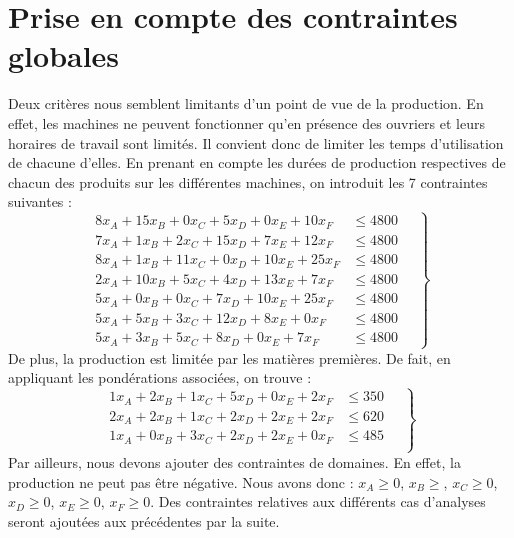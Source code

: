 \documentclass[12pt]{article}
\begin{document}
\section{Prise en compte des contraintes globales}
\label{globconst}
Deux critères nous semblent limitants d'un point de vue de la production. En effet, les machines ne peuvent fonctionner qu'en présence des ouvriers et leurs horaires de travail sont limités. Il convient donc de limiter les temps d'utilisation de chacune d'elles.
En prenant en compte les durées de production respectives de chacun des produits sur les différentes machines, on introduit les 7 contraintes suivantes :
\begin{equation*}
\left.
\begin{aligned}
    8x_{A} + 15x_{B} + 0x_{C} + 5x_{D} + 0x_{E} + 10x_{F} &\leq 4800
    \quad\\
      7x_{A} + 1x_{B} + 2x_{C} + 15x_{D} + 7x_{E} + 12x_{F} &\leq 4800 \\
      8x_{A} + 1x_{B} + 11x_{C} + 0x_{D} + 10x_{E} + 25x_{F} &\leq 4800 \\
      2x_{A} + 10x_{B} + 5x_{C} + 4x_{D} + 13x_{E} + 7x_{F} &\leq 4800 \\
      5x_{A} + 0x_{B} + 0x_{C} + 7x_{D} + 10x_{E} + 25x_{F} &\leq 4800 \\
      5x_{A} + 5x_{B} + 3x_{C} + 12x_{D} + 8x_{E} + 0x_{F} &\leq 4800 \\
      5x_{A} + 3x_{B} + 5x_{C} + 8x_{D} + 0x_{E} + 7x_{F} &\leq 4800 
\end{aligned}
\right\}
\end{equation*}
De plus, la production est limitée par les matières premières. De fait, en appliquant les pondérations associées, on trouve :
\begin{equation*}
\left.
\begin{aligned}
         1x_{A} + 2x_{B} + 1x_{C} + 5x_{D} + 0x_{E} + 2x_{F} &\leq 350 \quad\\
      2x_{A} + 2x_{B} + 1x_{C} + 2x_{D} + 2x_{E} + 2x_{F} &\leq 620 \\
      1x_{A} + 0x_{B} + 3x_{C} + 2x_{D} + 2x_{E} + 0x_{F} &\leq 485 \\
\end{aligned}
\right\}
\end{equation*}
Par ailleurs, nous devons ajouter des contraintes de domaines. En effet, la production ne peut pas être négative. Nous avons donc :
\(x_{A} \geq 0\), \(x_{B} \geq\), \(x_{C} \geq 0\), \(x_{D} \geq 0\), \(x_{E} \geq 0\), \(x_{F} \geq 0 \).
Des contraintes relatives aux différents cas d'analyses seront ajoutées aux précédentes par la suite.
\end{document}
